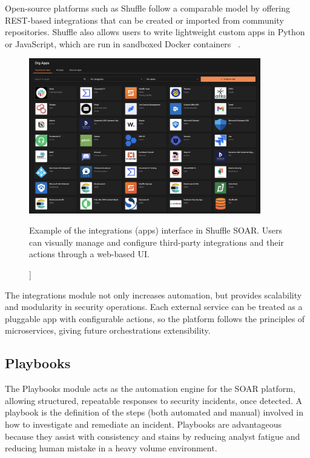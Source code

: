 Open-source platforms such as Shuffle follow a comparable model by offering REST-based integrations that can be created or imported from community repositories. Shuffle also allows users to write lightweight custom apps in Python or JavaScript, which are run in sandboxed Docker containers ~\cite{techtarget}.

\begin{figure}[ht]
    \centering
    \includegraphics[width=0.9\textwidth]{images/shuffle_soar_apps.png}
    \caption[[Example of the integrations (apps) interface in Shuffle SOAR]]{Example of the integrations (apps) interface in Shuffle SOAR. Users can visually manage and configure third-party integrations and their actions through a web-based UI.}
    \label{fig:shuffle-soar-apps}
\end{figure}

The integrations module not only increases automation, but provides scalability and modularity in security operations. Each external service can be treated as a pluggable app with configurable actions, so the platform follows the principles of microservices, giving future orchestrations extensibility.

\subsection{Playbooks}

The Playbooks module acts as the automation engine for the SOAR platform, allowing structured, repeatable responses to security incidents, once detected. A playbook is the definition of the steps (both automated and manual) involved in how to investigate and remediate an incident. Playbooks are advantageous because they assist with consistency and stains by reducing analyst fatigue and reducing human mistake in a heavy volume environment.

